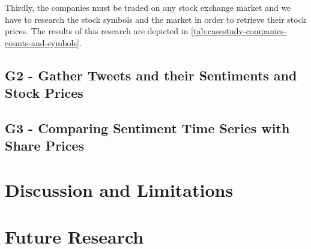 Thirdly, the companies must be traded on any stock exchange market and we have to research the stock symbols and the market in order to retrieve their stock prices.
The results of this research are depicted in \cref{tab:casestudy-companies-counts-and-symbols}.

\subsection{G2 - Gather Tweets and their Sentiments and Stock Prices}
\label{ss:conclusion-summary-g2}


\subsection{G3 - Comparing Sentiment Time Series with Share Prices}
\label{ss:conclusion-summary-g3}



\section{Discussion and Limitations}
\label{s:conclusions-discussion}

\section{Future Research}
\label{s:conclusions-future}

